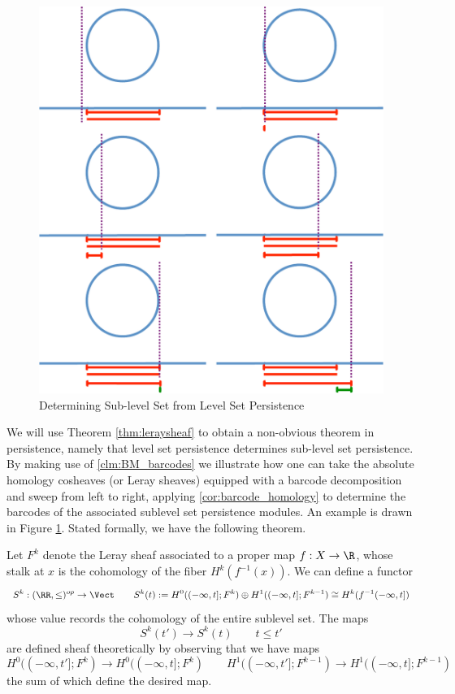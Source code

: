 \begin{figure}
\begin{center}
\includegraphics[width=\textwidth]{level_to_sub.pdf}
\end{center}
\caption{Determining Sub-level Set from Level Set Persistence}
\label{fig:level_to_sub}
\end{figure}

We will use Theorem \ref{thm:leraysheaf} to obtain a non-obvious theorem in persistence, namely that level set persistence determines sub-level set persistence. By making use of \ref{clm:BM_barcodes} we illustrate how one can take the absolute homology cosheaves (or Leray sheaves) equipped with a barcode decomposition and sweep from left to right, applying \ref{cor:barcode_homology} to determine the barcodes of the associated sublevel set persistence modules. An example is drawn in Figure \ref{fig:level_to_sub}. Stated formally, we have the following theorem.

\begin{thm}\label{thm:level-to-sub}
Let $F^k$ denote the Leray sheaf associated to a proper map $f:X\to\R$, whose stalk at $x$ is the cohomology of the fiber $H^k(f^{-1}(x))$. We can define a functor
\[
	S^k:(\RR,\leq)^{op}\to\Vect \qquad S^k(t):=H^0((-\infty,t];F^k)\oplus H^1((-\infty,t];F^{k-1})\cong H^k(f^{-1}(-\infty,t])
\]
whose value records the cohomology of the entire sublevel set. The maps
\[
	S^k(t')\to S^k(t) \qquad t\leq t'
\]
are defined sheaf theoretically by observing that we have maps
\[
	H^0((-\infty,t'];F^k)\to H^0((-\infty,t];F^k) \qquad H^1((-\infty,t'];F^{k-1})\to H^1((-\infty,t];F^{k-1})
\]
the sum of which define the desired map.
\end{thm} 

